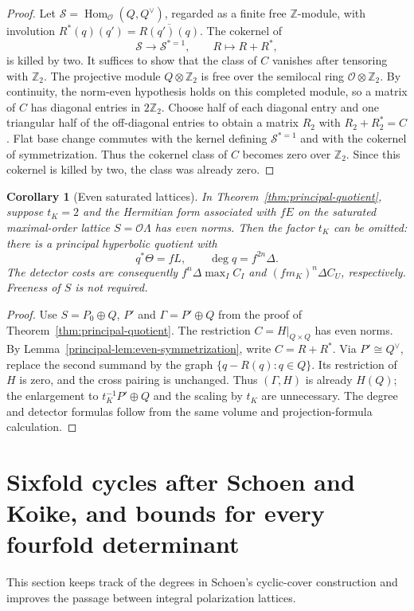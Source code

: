 \documentclass[11pt]{article}
\newtheorem{corollary}[theorem]{Corollary}
\theoremstyle{definition}
\theoremstyle{remark}
\begin{document}
\begin{proof}
Let $\mathcal S=\operatorname{Hom}_{\mathcal O}(Q,Q^\vee)$,
regarded as a finite free $\mathbb Z$-module, with involution
$R^*(q)(q')=\overline{R(q')(q)}$.
The cokernel of
\[
 \mathcal S\longrightarrow\mathcal S^{*=1},
 \qquad R\longmapsto R+R^*,
\]
is killed by two.
It suffices to show that the class of $C$ vanishes after tensoring
with $\mathbb Z_2$.
The projective module $Q\otimes\mathbb Z_2$ is free over
the semilocal ring $\mathcal O\otimes\mathbb Z_2$.
By continuity, the norm-even hypothesis holds on this completed
module, so a matrix of $C$ has diagonal entries in $2\mathbb Z_2$.
Choose half of each diagonal entry and one triangular half of the
off-diagonal entries to obtain a matrix $R_2$ with
$R_2+R_2^*=C$.
Flat base change commutes with the kernel defining
$\mathcal S^{*=1}$ and with the cokernel of symmetrization.
Thus the cokernel class of $C$ becomes zero over $\mathbb Z_2$.
Since this cokernel is killed by two, the class was already zero.
\end{proof}

\begin{corollary}[Even saturated lattices]
\label{principal-cor:even-saturation}
In Theorem~\ref{thm:principal-quotient}, suppose $t_K=2$ and
the Hermitian form associated with $fE$ on the saturated
maximal-order lattice $S=\mathcal O\Lambda$ has even norms.
Then the factor $t_K$ can be omitted:
there is a principal hyperbolic quotient with
\[
 q^*\Theta=fL,\qquad \deg q=f^{2n}\Delta.
\]
The detector costs are consequently
$f^n\Delta\max_I C_I$ and $(fm_K)^n\Delta C_U$, respectively.
Freeness of $S$ is not required.
\end{corollary}

\begin{proof}
Use $S=P_0\oplus Q$, $P'$ and $\Gamma=P'\oplus Q$ from the proof
of Theorem~\ref{thm:principal-quotient}.
The restriction $C=H|_{Q\times Q}$ has even norms.
By Lemma~\ref{principal-lem:even-symmetrization}, write $C=R+R^*$.
Via $P'\cong Q^\vee$, replace the second summand by the graph
$\{q-R(q):q\in Q\}$.
Its restriction of $H$ is zero, and the cross pairing is unchanged.
Thus $(\Gamma,H)$ is already $H(Q)$; the enlargement to
$t_K^{-1}P'\oplus Q$ and the scaling by $t_K$ are unnecessary.
The degree and detector formulas follow from the same volume and
projection-formula calculation.
\end{proof}

\section{Sixfold cycles after Schoen and Koike, and bounds for every fourfold determinant}
\label{sec:sixfolds}
This section keeps track of the degrees in Schoen's cyclic-cover construction and improves the passage between integral polarization lattices.
\end{document}

